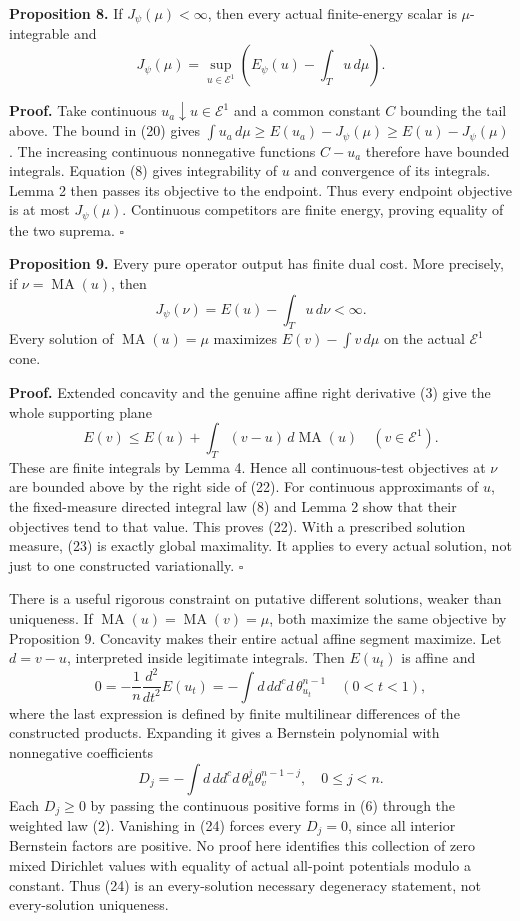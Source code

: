 \documentclass[
]{article}
\begin{document}
\textbf{Proposition 8.} If \(J_\psi(\mu)<\infty\), then every actual
finite-energy scalar is \(\mu\)-integrable and \[
J_\psi(\mu)=\sup_{u\in\mathcal E^1}\left(E_\psi(u)-\int_Tu\,d\mu\right).
\tag{21}
\]

\textbf{Proof.} Take continuous \(u_a\downarrow u\in\mathcal E^1\) and a
common constant \(C\) bounding the tail above. The bound in (20) gives
\(\int u_a\,d\mu\geq E(u_a)-J_\psi(\mu)\geq E(u)-J_\psi(\mu)\). The
increasing continuous nonnegative functions \(C-u_a\) therefore have
bounded integrals. Equation (8) gives integrability of \(u\) and
convergence of its integrals. Lemma 2 then passes its objective to the
endpoint. Thus every endpoint objective is at most \(J_\psi(\mu)\).
Continuous competitors are finite energy, proving equality of the two
suprema. \(\square\)

\textbf{Proposition 9.} Every pure operator output has finite dual cost.
More precisely, if \(\nu=\operatorname{MA}(u)\), then \[
J_\psi(\nu)=E(u)-\int_Tu\,d\nu<\infty.
\tag{22}
\] Every solution of \(\operatorname{MA}(u)=\mu\) maximizes
\(E(v)-\int v\,d\mu\) on the actual \(\mathcal E^1\) cone.

\textbf{Proof.} Extended concavity and the genuine affine right
derivative (3) give the whole supporting plane \[
E(v)\leq E(u)+\int_T(v-u)\,d\operatorname{MA}(u)\quad(v\in\mathcal E^1).
\tag{23}
\] These are finite integrals by Lemma 4. Hence all continuous-test
objectives at \(\nu\) are bounded above by the right side of (22). For
continuous approximants of \(u\), the fixed-measure directed integral
law (8) and Lemma 2 show that their objectives tend to that value. This
proves (22). With a prescribed solution measure, (23) is exactly global
maximality. It applies to every actual solution, not just to one
constructed variationally. \(\square\)

There is a useful rigorous constraint on putative different solutions,
weaker than uniqueness. If
\(\operatorname{MA}(u)=\operatorname{MA}(v)=\mu\), both maximize the
same objective by Proposition 9. Concavity makes their entire actual
affine segment maximize. Let \(d=v-u\), interpreted inside legitimate
integrals. Then \(E(u_t)\) is affine and \[
0=-\frac1n\frac{d^2}{dt^2}E(u_t)
=-\int d\,dd^cd\,\theta_{u_t}^{n-1}\quad(0<t<1),
\tag{24}
\] where the last expression is defined by finite multilinear
differences of the constructed products. Expanding it gives a Bernstein
polynomial with nonnegative coefficients \[
D_j=-\int d\,dd^cd\,\theta_u^j\theta_v^{n-1-j},\quad 0\leq j<n.
\] Each \(D_j\geq0\) by passing the continuous positive forms in (6)
through the weighted law (2). Vanishing in (24) forces every \(D_j=0\),
since all interior Bernstein factors are positive. No proof here
identifies this collection of zero mixed Dirichlet values with equality
of actual all-point potentials modulo a constant. Thus (24) is an
every-solution necessary degeneracy statement, not every-solution
uniqueness.
\end{document}
